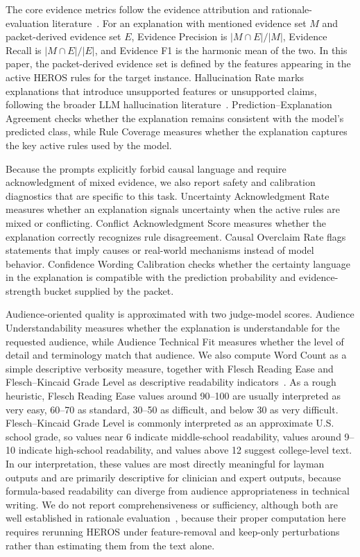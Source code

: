 \documentclass[sigconf,nonacm]{acmart}
\begin{document}
The core evidence metrics follow the evidence attribution and rationale-evaluation literature~\cite{deyoung2020eraser,xing2025evidence}. For an explanation with mentioned evidence set $M$ and packet-derived evidence set $E$, Evidence Precision is $\lvert M \cap E \rvert / \lvert M \rvert$, Evidence Recall is $\lvert M \cap E \rvert / \lvert E \rvert$, and Evidence F1 is the harmonic mean of the two. In this paper, the packet-derived evidence set is defined by the features appearing in the active HEROS rules for the target instance. Hallucination Rate marks explanations that introduce unsupported features or unsupported claims, following the broader LLM hallucination literature~\cite{bang2025hallulens}. Prediction--Explanation Agreement checks whether the explanation remains consistent with the model's predicted class, while Rule Coverage measures whether the explanation captures the key active rules used by the model.

Because the prompts explicitly forbid causal language and require acknowledgment of mixed evidence, we also report safety and calibration diagnostics that are specific to this task. Uncertainty Acknowledgment Rate measures whether an explanation signals uncertainty when the active rules are mixed or conflicting. Conflict Acknowledgment Score measures whether the explanation correctly recognizes rule disagreement. Causal Overclaim Rate flags statements that imply causes or real-world mechanisms instead of model behavior. Confidence Wording Calibration checks whether the certainty language in the explanation is compatible with the prediction probability and evidence-strength bucket supplied by the packet.

Audience-oriented quality is approximated with two judge-model scores. Audience Understandability measures whether the explanation is understandable for the requested audience, while Audience Technical Fit measures whether the level of detail and terminology match that audience. We also compute Word Count as a simple descriptive verbosity measure, together with Flesch Reading Ease and Flesch--Kincaid Grade Level as descriptive readability indicators~\cite{flesch1948readability,kincaid1975derivation}. As a rough heuristic, Flesch Reading Ease values around 90--100 are usually interpreted as very easy, 60--70 as standard, 30--50 as difficult, and below 30 as very difficult. Flesch--Kincaid Grade Level is commonly interpreted as an approximate U.S. school grade, so values near 6 indicate middle-school readability, values around 9--10 indicate high-school readability, and values above 12 suggest college-level text. In our interpretation, these values are most directly meaningful for layman outputs and are primarily descriptive for clinician and expert outputs, because formula-based readability can diverge from audience appropriateness in technical writing. We do not report comprehensiveness or sufficiency, although both are well established in rationale evaluation~\cite{deyoung2020eraser}, because their proper computation here requires rerunning HEROS under feature-removal and keep-only perturbations rather than estimating them from the text alone.
\end{document}
